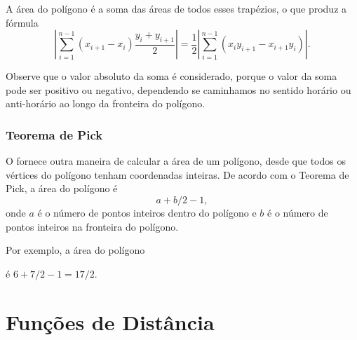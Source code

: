 A área do polígono é a soma das áreas de
todos esses trapézios, o que produz a fórmula
\[|\sum_{i=1}^{n-1} (x_{i+1}-x_{i}) \frac{y_i+y_{i+1}}{2}| =
\frac{1}{2} |\sum_{i=1}^{n-1} (x_i y_{i+1} - x_{i+1} y_i)|.\]

Observe que o valor absoluto da soma é considerado,
porque o valor da soma pode ser positivo ou negativo,
dependendo se caminhamos no sentido horário ou anti-horário
ao longo da fronteira do polígono.

\subsubsection{Teorema de Pick}


O  fornece outra maneira de calcular
a área de um polígono, desde que todos os vértices
do polígono tenham coordenadas inteiras.
De acordo com o Teorema de Pick, a área do polígono é
\[ a + b/2 -1,\]
onde $a$ é o número de pontos inteiros dentro do polígono
e $b$ é o número de pontos inteiros na fronteira do polígono.

Por exemplo, a área do polígono
\begin{center}
\end{center}
é $6+7/2-1=17/2$.

\section{Funções de Distância}



